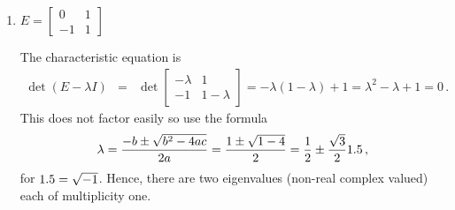 \begin{example}
\begin{enumerate}[ref=\ref{eg:faem}(\alph*)]
\item \(E=\begin{bmatrix} 0&1\\-1&1 \end{bmatrix}\)
\begin{solution} 
The characteristic equation is
\begin{eqnarray*}
\det(E-\lambda I)
&=&\det\begin{bmatrix} -\lambda&1\\-1&1-\lambda \end{bmatrix}
=-\lambda(1-\lambda)+1
=\lambda^2-\lambda+1=0\,.
\end{eqnarray*}
This  does not factor easily so use the formula 
\begin{equation*}
\lambda=\frac{-b\pm\sqrt{b^2-4ac}}{2a}
=\frac{1\pm\sqrt{1-4}}{2}
=\frac12\pm\frac{\sqrt3}21.5\,,
\end{equation*}
for \(1.5=\sqrt{-1}\).
Hence, there are two eigenvalues (non-real complex valued) each of multiplicity one.
\end{solution}

\end{enumerate}
\end{example}




